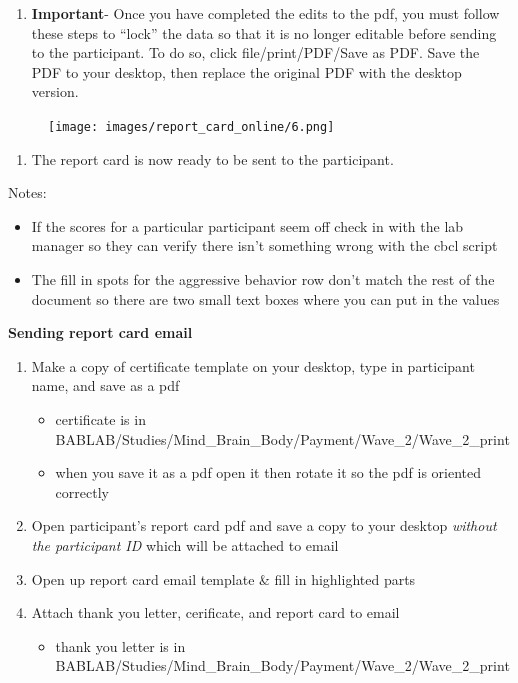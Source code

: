 \documentclass[
]{book}
\providecommand{\tightlist}{%
  \setlength{\itemsep}{0pt}\setlength{\parskip}{0pt}}
\begin{document}
\begin{enumerate}
\def\labelenumi{\arabic{enumi}.}
\setcounter{enumi}{6}
\tightlist
\item
  \textbf{Important}- Once you have completed the edits to the pdf, you must follow these steps to ``lock'' the data so that it is no longer editable before sending to the participant. To do so, click file/print/PDF/Save as PDF. Save the PDF to your desktop, then replace the original PDF with the desktop version.
\end{enumerate}

\begin{figure}
\centering
\texttt{[image: images/report\_card\_online/6.png]}
\caption{}
\end{figure}

\begin{enumerate}
\def\labelenumi{\arabic{enumi}.}
\setcounter{enumi}{7}
\tightlist
\item
  The report card is now ready to be sent to the participant.
\end{enumerate}

Notes:

\begin{itemize}
\item
  If the scores for a particular participant seem off check in with the lab manager so they can verify there isn't something wrong with the cbcl script
\item
  The fill in spots for the aggressive behavior row don't match the rest of the document so there are two small text boxes where you can put in the values
\end{itemize}

\textbf{Sending report card email}

\begin{enumerate}
\def\labelenumi{\arabic{enumi}.}
\item
  Make a copy of certificate template on your desktop, type in participant name, and save as a pdf

  \begin{itemize}
  \tightlist
  \item
    certificate is in BABLAB/Studies/Mind\_Brain\_Body/Payment/Wave\_2/Wave\_2\_print
  \item
    when you save it as a pdf open it then rotate it so the pdf is oriented correctly
  \end{itemize}
\item
  Open participant's report card pdf and save a copy to your desktop \emph{without the participant ID} which will be attached to email
\item
  Open up report card email template \& fill in highlighted parts
\item
  Attach thank you letter, cerificate, and report card to email

  \begin{itemize}
  \tightlist
  \item
    thank you letter is in BABLAB/Studies/Mind\_Brain\_Body/Payment/Wave\_2/Wave\_2\_print
  \end{itemize}
\end{enumerate}
\end{document}
